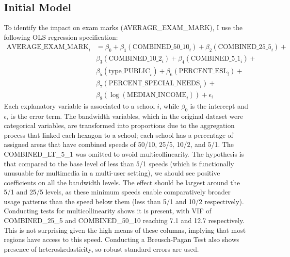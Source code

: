 \documentclass[stu, floatsintext]{apa7}
\begin{document}
    \subsection{Initial Model}
    To identify the impact on exam marks (AVERAGE\_EXAM\_MARK), I use the following OLS regression specification:
    \begin{align*}
        \text{AVERAGE\_EXAM\_MARK}_i &= \beta_0 + \beta_1(\text{COMBINED\_50\_10}_i) + \beta_2(\text{COMBINED\_25\_5}_i) + \\
        & \beta_3(\text{COMBINED\_10\_2}_i) + \beta_4(\text{COMBINED\_5\_1}_i) + \\
        & \beta_5(\text{type\_PUBLIC}_i) + \beta_6(\text{PERCENT\_ESL}_i) + \\
        & \beta_7(\text{PERCENT\_SPECIAL\_NEEDS}_i) + \\
        & \beta_8(\log(\text{MEDIAN\_INCOME}_i)) + \epsilon_i
    \end{align*}
    Each explanatory variable is associated to a school $i$, while $\beta_0$ is the intercept and $\epsilon_i$ is the error term. The bandwidth variables, which in the original dataset were categorical variables, are transformed into proportions due to the aggregation process that linked each hexagon to a school; each school has a percentage of assigned areas that have combined speeds of 50/10, 25/5, 10/2, and 5/1. The COMBINED\_LT\_5\_1 was omitted to avoid multicollinearity. The hypothesis is that compared to the base level of less than 5/1 speeds (which is functionally unusuable for multimedia in a multi-user setting), we should see positive coefficients on all the bandwidth levels. The effect should be largest around the 5/1 and 25/5 levels, as these minimum speeds enable comparatively broader usage patterns than the speed below them (less than 5/1 and 10/2 respectively). Conducting tests for multicollinearity shows it is present, with VIF of COMBINED\_25\_5 and COMBINED\_50\_10 reaching 7.1 and 12.7 respectively. This is not surprising given the high means of these columns, implying that most regions have access to this speed. Conducting a Breusch-Pagan Test also shows presence of heteroskedasticity, so robust standard errors are used. \\
    
\end{document}
